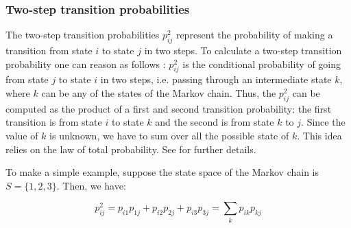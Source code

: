 \documentclass[\main/main.tex]{subfiles}
\begin{document}
\subsubsection{Two-step transition probabilities}

\noindent The two-step transition probabilities $p_{ij}^2$ represent the probability of making a transition from state $i$ to state $j$ in two steps. To calculate a two-step transition probability one can reason as follows \citep{Sheskin2010}: $p_{ij}^2$ is the conditional probability of going from state $j$ to state $i$ in two steps, i.e. passing through an intermediate state $k$, where $k$ can be any of the states of the Markov chain. Thus, the $p_{ij}^2$ can be computed as the product of a first and second transition probability: the first transition is from state $i$ to state $k$ and the second is from state $k$ to $j$. Since the value of $k$ is unknown, we have to sum over all the possible state of $k$. This idea relies on the law of total probability. See \cite{Zwillinger2000} for further details.

To make a simple example, suppose the state space of the Markov chain is $S = \{ 1,2,3\}$. Then, we have:

\begin{equation}
    p_{ij}^2 = p_{i1}p_{1j} + p_{i2}p_{2j} + p_{i3}p_{3j} = \sum_k p_{ik}p_{kj}
\end{equation}
\end{document}
